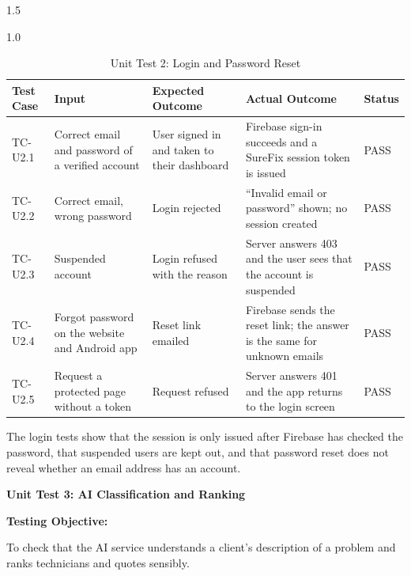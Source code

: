 \documentclass[A4paper,12pt]{report}
\theoremstyle{plain}
\theoremstyle{definition}
\theoremstyle{remark}
\numberwithin{equation}{section}
\begin{document}
\begin{spacing}{1.5}
\begin{table}[H]
\centering
\caption{Unit Test 2: Login and Password Reset}
\begin{spacing}{1.0}
{\small
\begin{tabular}{|p{}|p{}|p{}|p{}|p{}|}
\hline
\textbf{Test Case} & \textbf{Input} & \textbf{Expected Outcome} & \textbf{Actual Outcome} & \textbf{Status} \\ \hline
TC-U2.1 & Correct email and password of a verified account & User signed in and taken to their dashboard & Firebase sign-in succeeds and a SureFix session token is issued & PASS \\ \hline
TC-U2.2 & Correct email, wrong password & Login rejected & ``Invalid email or password'' shown; no session created & PASS \\ \hline
TC-U2.3 & Suspended account & Login refused with the reason & Server answers 403 and the user sees that the account is suspended & PASS \\ \hline
TC-U2.4 & Forgot password on the website and Android app & Reset link emailed & Firebase sends the reset link; the answer is the same for unknown emails & PASS \\ \hline
TC-U2.5 & Request a protected page without a token & Request refused & Server answers 401 and the app returns to the login screen & PASS \\ \hline
\end{tabular}}
\end{spacing}
\end{table}

The login tests show that the session is only issued after Firebase has checked the password, that suspended users are kept out, and that password reset does not reveal whether an email address has an account.

\textbf{Unit Test 3: AI Classification and Ranking}

\textbf{Testing Objective:}

To check that the AI service understands a client's description of a problem and ranks technicians and quotes sensibly.


\end{spacing}
\end{document}
